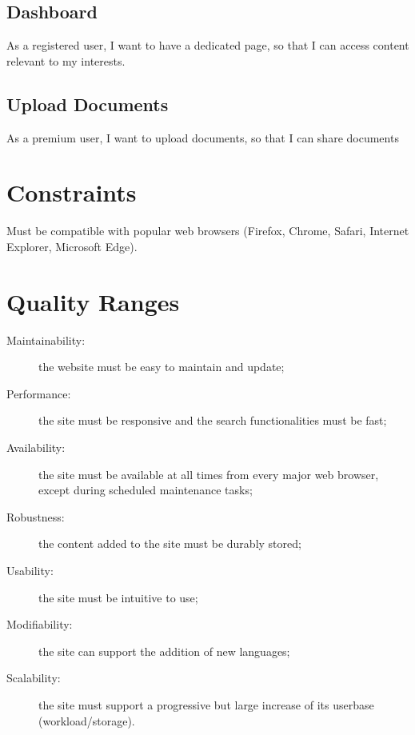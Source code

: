 \documentclass [a4paper, 12pt] {article}
\begin{document}
\subsection{Dashboard}
As a registered user, I want to have a dedicated page, so that I can access content relevant to my interests.

\subsection{Upload Documents}
As a premium user, I want to upload documents, so that I can share documents



\section{Constraints}
Must be compatible with popular web browsers (Firefox, Chrome, Safari, Internet Explorer, Microsoft Edge).



\section{Quality Ranges}
\begin{description}
	\item [Maintainability:] the website must be easy to maintain and update;
	\item [Performance:] the site must be responsive and the search functionalities must be fast;
	\item [Availability:] the site must be available at all times from every major web browser, except during scheduled maintenance tasks;
	\item [Robustness:] the content added to the site must be durably stored;
	\item [Usability:] the site must be intuitive to use;
	\item [Modifiability:] the site can support the addition of new languages;
	\item [Scalability:] the site must support a progressive but large increase of its userbase (workload/storage).
\end{description}
\end{document}
